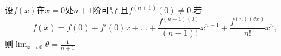 \documentclass[12pt, a4paper, oneside, UTF8]{ctexbook}
\begin{document}
\begin{corollary}[中值的极限值]
    设$f(x)$在$x=0$处$n+1$阶可导,且$f^{(n+1)}(0)\neq 0$.若
    \[
    f(x)=f(0)+f'(0)x+\ldots+\frac{f^{(n-1)(0)}}{(n-1)!}x^{n-1} + \frac{f^{(n)(\theta x)}}{n!}x^{n},
    \]
    \newline
    则$\lim_{x\rightarrow 0}\theta=\frac{1}{n+1}$
\end{corollary}

\ifx\allfiles\undefined
\end{document}
